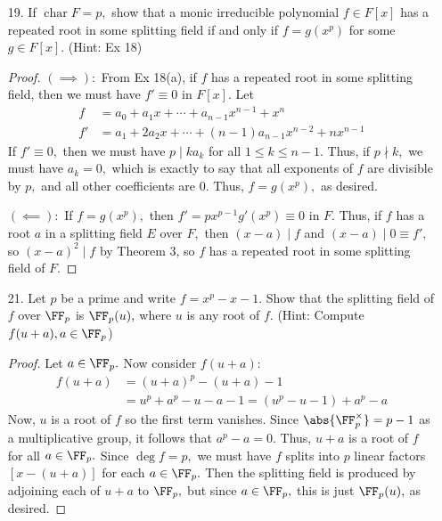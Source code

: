 \documentclass{article}
\DeclareMathOperator{\cha}{char}
\begin{document}
\begin{itemize}
\begin{enumerate}[(a)]
		\end{enumerate}

	\item[19.] If $\cha F=p,$ show that a monic irreducible polynomial $f\in F[x]$ has a repeated root in some splitting field if and only if $f=g(x^p)$ for some $g\in F[x].$ (Hint: Ex 18)
		\begin{proof}
			$(\implies):$ From Ex 18(a), if $f$ has a repeated root in some splitting field, then we must have $f'\equiv0$ in $F[x].$ Let
			\begin{align*}
				f &= a_0+a_1x+\cdots+a_{n-1}x^{n-1} + x^n \\
				f' &= a_1 + 2a_2x + \cdots + (n-1)a_{n-1} x^{n-2} + nx^{n-1}
			\end{align*}
			If $f'\equiv0,$ then we must have $p\mid ka_k$ for all $1\le k\le n-1.$ Thus, if $p\nmid k,$ we must have $a_k=0,$ which is exactly to say that all exponents of $f$ are divisible by $p,$ and all other coefficients are 0. Thus, $f=g(x^p),$ as desired.

			$(\impliedby):$ If $f=g(x^p),$ then $f'=px^{p-1} g'(x^p) \equiv 0$ in $F.$ Thus, if $f$ has a root $a$ in a splitting field $E$ over $F,$ then $(x-a)\mid f$ and $(x-a)\mid 0\equiv f',$ so $(x-a)^2\mid f$ by Theorem 3, so $f$ has a repeated root in some splitting field of $F.$
		\end{proof}

	\item[21.] Let $p$ be a prime and write $f=x^p-x-1.$ Show that the splitting field of $f$ over $\FF_p$ is $\FF_p(u),$ where $u$ is any root of $f.$ (Hint: Compute $f(u+a), a\in\FF_p$)
		\begin{proof}
			Let $a\in\FF_p.$ Now consider $f(u+a):$
			\begin{align*}
				f(u+a) &= (u+a)^p-(u+a)-1 \\
				&= u^p+a^p-u-a-1 = (u^p-u-1) + a^p - a 
			\end{align*}
			Now, $u$ is a root of $f$ so the first term vanishes. Since $\abs{\FF_p^\times}=p-1$ as a multiplicative group, it follows that $a^p-a=0.$ Thus, $u+a$ is a root of $f$ for all $a\in \FF_p.$ Since $\deg f=p,$ we must have $f$ splits into $p$ linear factors $\left[ x-(u+a) \right]$ for each $a\in\FF_p.$ Then the splitting field is produced by adjoining each of $u+a$ to $\FF_p,$ but since $a\in\FF_p,$ this is just $\FF_p(u),$ as desired.
		\end{proof}


\end{itemize}
\end{document}
